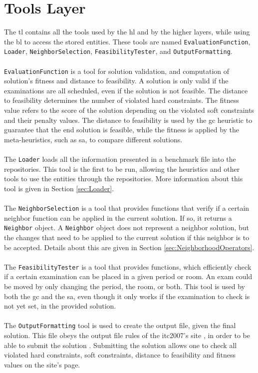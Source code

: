 \section{Tools Layer}
\label{subsec:ToolsLayer}
The \gls{tl} contains all the tools used by the \gls{hl} and by the higher layers, while using the \gls{bl} to access the stored entities. These tools are named \verb+EvaluationFunction+, \verb+Loader+, \verb+NeighborSelection+, \verb+FeasibilityTester+, and \verb+OutputFormatting+.\\
\\
\verb+EvaluationFunction+ is a tool  for solution validation, and computation of solution's fitness and distance to feasibility. A solution is only valid if the examinations are all scheduled, even if the solution is not feasible. The distance to feasibility determines the number of violated hard constraints. The fitness value refers to the score of the solution depending on the violated soft constraints and their penalty values. The distance to feasibility is used by the \gls{gc} heuristic to guarantee that the end solution is feasible, while the fitness is applied by the meta-heuristics, such as \gls{sa}, to compare different solutions.\\
\\
The \verb+Loader+ loads all the information presented in a benchmark file into the repositories. This tool is the first to be run, allowing the heuristics and other tools to use the entities through the repositories. More information about this tool is given in Section \ref{sec:Loader}.\\
\\
The \verb+NeighborSelection+ is a tool that provides functions that verify if a certain neighbor function can be applied in the current solution. If so, it returns a \verb+Neighbor+ object. A \verb+Neighbor+ object does not represent a neighbor solution, but the changes that need to be applied to the current solution if this neighbor is to be accepted. Details about this are given in Section \ref{sec:NeighborhoodOperators}.\\
\\
The \verb+FeasibilityTester+ is a tool that provides functions, which efficiently check if a certain examination can be placed in a given period or room. An exam could be moved by only changing the period, the room, or both. This tool is used by both the \gls{gc} and the \gls{sa}, even though it only works if the examination to check is not yet set, in the provided solution.\\
\\
The \verb+OutputFormatting+ tool is used to create the output file, given the final solution. This file obeys the output file rules of the \gls{itc2007}'s site \cite{McCollum2007b}, in order to be able to submit the solution \cite{McCollum2007c}. Submitting the solution allows one to check all violated hard constraints, soft constraints, distance to feasibility and fitness values on the site's page.

